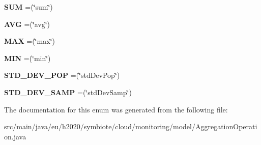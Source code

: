 \begin{DoxyCompactItemize}
\item 
\mbox{\label{enumeu_1_1h2020_1_1symbiote_1_1cloud_1_1monitoring_1_1model_1_1AggregationOperation_a8e60224ffbd85a02e5b5e9a738cf43de}} 
{\bfseries S\+UM} =(\char`\"{}sum\char`\"{})
\item 
\mbox{\label{enumeu_1_1h2020_1_1symbiote_1_1cloud_1_1monitoring_1_1model_1_1AggregationOperation_a42c839b3de0b88e54f3f50e3ebbc32f6}} 
{\bfseries A\+VG} =(\char`\"{}avg\char`\"{})
\item 
\mbox{\label{enumeu_1_1h2020_1_1symbiote_1_1cloud_1_1monitoring_1_1model_1_1AggregationOperation_a3feaf942308e4c421da83bf3a38789a6}} 
{\bfseries M\+AX} =(\char`\"{}max\char`\"{})
\item 
\mbox{\label{enumeu_1_1h2020_1_1symbiote_1_1cloud_1_1monitoring_1_1model_1_1AggregationOperation_a9e08f3829b7d12e1deacdfddd826dbb9}} 
{\bfseries M\+IN} =(\char`\"{}min\char`\"{})
\item 
\mbox{\label{enumeu_1_1h2020_1_1symbiote_1_1cloud_1_1monitoring_1_1model_1_1AggregationOperation_aa0c3a24e64f6bc8f71ad8b83bbb48854}} 
{\bfseries S\+T\+D\+\_\+\+D\+E\+V\+\_\+\+P\+OP} =(\char`\"{}std\+Dev\+Pop\char`\"{})
\item 
\mbox{\label{enumeu_1_1h2020_1_1symbiote_1_1cloud_1_1monitoring_1_1model_1_1AggregationOperation_a4cecf8584e9b242c4630a9f57241e333}} 
{\bfseries S\+T\+D\+\_\+\+D\+E\+V\+\_\+\+S\+A\+MP} =(\char`\"{}std\+Dev\+Samp\char`\"{})
\end{DoxyCompactItemize}


The documentation for this enum was generated from the following file\+:\begin{DoxyCompactItemize}
\item 
src/main/java/eu/h2020/symbiote/cloud/monitoring/model/Aggregation\+Operation.\+java\end{DoxyCompactItemize}
